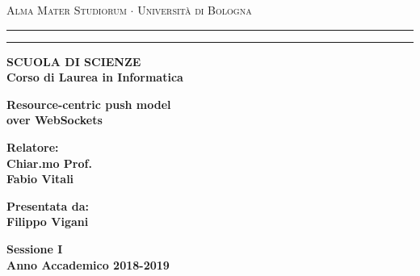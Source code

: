 \documentclass[12pt,a4paper,openright,twoside]{report}
\begin{document}

\begin{titlepage}
\begin{center}
{{\Large{\textsc{Alma Mater Studiorum $\cdot$ Universit\`a di
Bologna}}}} \rule[0.1cm]{15.8cm}{0.1mm}
\rule[0.5cm]{15.8cm}{0.6mm}
{\small{\bf SCUOLA DI SCIENZE\\
Corso di Laurea in Informatica }}
\end{center}
\vspace{40mm}
\begin{center}
{\LARGE{\bf Resource-centric push model}}\\
\vspace{3mm}
{\LARGE{\bf over WebSockets}}\\
\end{center}
\vspace{40mm}
\par
\noindent
\begin{minipage}[t]{0.47\textwidth}
{\large{\bf Relatore:\\
Chiar.mo Prof.\\
Fabio Vitali}}
\end{minipage}
\hfill
\begin{minipage}[t]{0.47\textwidth}\raggedleft
{\large{\bf Presentata da:\\
Filippo Vigani}}
\end{minipage}
\vspace{30mm}
\begin{center}
{\large{\bf Sessione I\\%
Anno Accademico 2018-2019}}%
\end{center}
\end{titlepage}


\cleardoublepage

\cleardoublepage
\thispagestyle{empty}
\large                                  %
\begin{flushright}
\em
\itshape

\end{flushright}
\cleardoublepage
\end{document}
